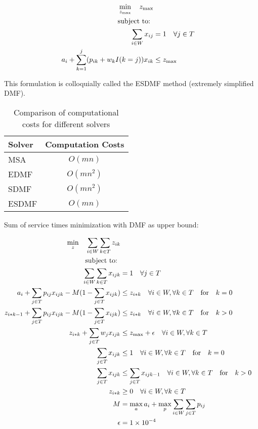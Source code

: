\documentclass{seal_thesis}
\begin{document}
\begin{align}
    \min_{z_{\text{max}}} \quad z_{\text{max}}\\
    \text{subject to: } \notag \\
    \sum_{i \in W} x_{ij} &= 1 \quad \forall j \in T\\
    a_i + \sum_{k=1}^j (p_{ik} + w_k I(k=j))x_{ik} &\leq z_{\text{max}}
\end{align}

This formulation is colloquially called the ESDMF method (extremely simplified DMF).


\begin{table}[htb]
\centering
\begin{tabular}{@{}lc@{}}
\toprule
Solver & Computation Costs \\ \midrule
MSA    & $O(mn)$           \\
EDMF   & $O(mn^2)$         \\
SDMF   & $O(mn^2)$         \\
ESDMF  & $O(mn)$           \\ \bottomrule
\end{tabular}
\caption{Comparison of computational costs for different solvers}
\label{tab:big_oh_solvers}
\end{table}

Sum of service times minimization with DMF as upper bound:

\begin{align}
    \min_z \quad \sum_{i \in W} \sum_{k \in T} z_{ik}\\
    \text{subject to: } \notag \\
    \sum_{i \in W} \sum_{k \in T} x_{ijk} &= 1 \quad \forall j \in T\\
    a_i + \sum_{j \in T} p_{ij} x_{ijk} - M(1 - \sum_{j \in T} x_{ijk}) &\leq z_{i*k} \quad \forall i \in W, \forall k \in T \quad \text{for} \quad k=0\\
    z_{i*k-1} + \sum_{j \in T} p_{ij} x_{ijk} - M(1 - \sum_{j \in T} x_{ijk}) &\leq z_{i*k} \quad \forall i \in W, \forall k \in T \quad \text{for} \quad k>0\\
    z_{i*k}+ \sum_{j \in T} w_j x_{ijk} &\leq z_{\text{max}} + \epsilon \quad \forall i \in W, \forall k \in T\\
    \sum_{j \in T} x_{ijk} &\leq 1 \quad \forall i \in W, \forall k \in T \quad \text{for} \quad k=0\\
    \sum_{j \in T} x_{ijk} &\leq \sum_{j \in T} x_{ijk-1} \quad \forall i \in W, \forall k \in T \quad \text{for} \quad k>0\\
    z_{i*k} &\geq 0 \quad \forall i \in W, \forall k \in T\\
    M &= \max_a a_i + \max_p \sum_{i \in W} \sum_{j \in T} p_{ij}\\
    \epsilon &= \num{1e-4}
\end{align}
\end{document}
